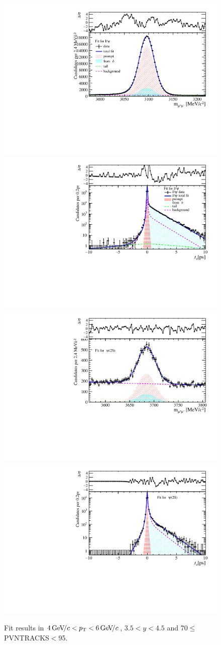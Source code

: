 \begin{figure}[H]
\begin{center}
\includegraphics[width=0.47\linewidth]{pdf/Jpsi/drawmass/n4y3pt3.pdf}
\includegraphics[width=0.47\linewidth]{pdf/Jpsi/2DFit/n4y3pt3.pdf}
\vspace*{-0.5cm}
\includegraphics[width=0.47\linewidth]{pdf/Psi2S/drawmass/n4y3pt3.pdf}
\includegraphics[width=0.47\linewidth]{pdf/Psi2S/2DFit/n4y3pt3.pdf}
\vspace*{-0.5cm}
\end{center}
\caption{Fit results in $4\text{\,Ge\kern -0.1em V\!/}c<p_{\mathrm{T}}<6\text{\,Ge\kern -0.1em V\!/}c$, $3.5<y<4.5$ and 70$\leq$PVNTRACKS$<$95.}
\label{Fitn4y3pt3}
\end{figure}
